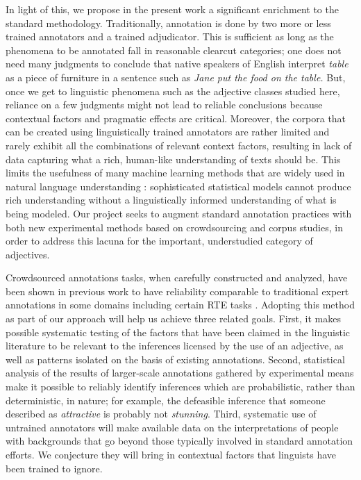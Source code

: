\documentclass[10pt]{article}
\begin{document}
\medskip
In  light of this, we propose in the present work a significant enrichment to the standard methodology. Traditionally, annotation is done by two more or less trained annotators and a trained adjudicator. This is sufficient as long as the phenomena to be annotated fall in reasonable clearcut categories; one does not need many judgments to conclude that native speakers of English interpret \emph{table} as a piece of furniture in a sentence such as \emph{Jane put the food on the table.} But, once we get to 
linguistic phenomena such as the adjective classes studied here, reliance on a few judgments might not lead to reliable conclusions because contextual factors and pragmatic effects are critical.  
Moreover, the corpora that can be created using linguistically trained annotators are rather limited and rarely exhibit all the combinations of relevant context factors, resulting in lack of data capturing what a rich, human-like understanding of texts should be. This limits the usefulness of many machine learning methods that are widely used in natural language understanding \cite{manning1999foundations,wasserman2004all,murphy2012machine}: sophisticated statistical models cannot produce rich understanding without a linguistically informed understanding of what is being modeled. Our project seeks to augment standard annotation practices with both new experimental methods based on crowdsourcing and corpus studies, in order to address this lacuna for the important, understudied category of adjectives.

Crowdsourced annotations tasks, when carefully constructed and analyzed, have been shown in previous work to have reliability comparable to traditional expert annotations in some domains including certain RTE tasks \cite{snow:08,munroetal2010}. Adopting this method as part of our approach will help us achieve three related goals. First, it makes possible systematic testing of the factors that have been claimed in the linguistic literature to be relevant to the inferences licensed by the use of an adjective, as well as patterns isolated on the basis of existing annotations. Second, statistical analysis of the results of larger-scale annotations gathered by experimental means make it possible to reliably identify inferences which are probabilistic, rather than deterministic, in nature; for example, the defeasible inference that someone described as \emph{attractive} is probably not \emph{stunning}. Third, systematic use of untrained annotators will make available data on the interpretations of people with backgrounds that go beyond those typically involved in standard annotation efforts. We conjecture they will bring in contextual factors that linguists have been trained to ignore.  
\end{document}
